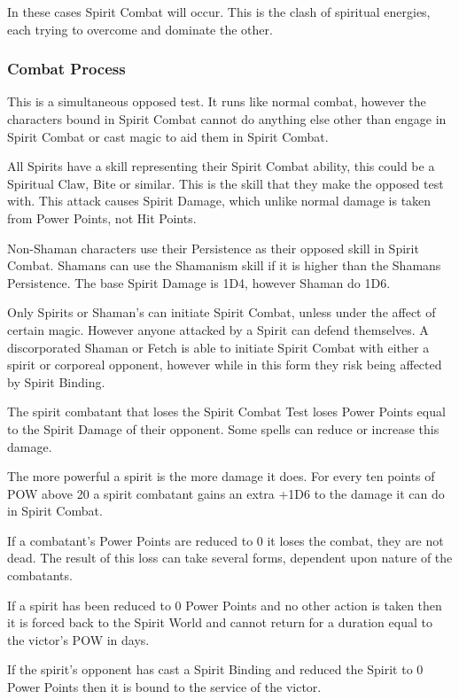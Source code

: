 In these cases Spirit Combat will occur. This is the clash of spiritual energies, each trying to overcome and dominate the other.

\subsubsection{Combat Process}
\begin{rpg-list}
\item This is a simultaneous opposed test. It runs like normal combat, however the characters bound in Spirit Combat cannot do anything else other than engage in Spirit Combat or cast magic to aid them in Spirit Combat. 
\item All Spirits have a skill representing their Spirit Combat ability, this could be a Spiritual Claw, Bite or similar. This is the skill that they make the opposed test with. This attack causes Spirit Damage, which unlike normal damage is taken from Power Points, not Hit Points.
\item Non-Shaman characters use their Persistence as their opposed skill in Spirit Combat. Shamans can use the Shamanism skill if it is higher than the Shamans Persistence. The base Spirit Damage is 1D4, however Shaman do 1D6.
\item Only Spirits or Shaman’s can initiate Spirit Combat, unless under the affect of certain magic. However anyone attacked by a Spirit can defend themselves. A discorporated Shaman or Fetch is able to initiate Spirit Combat with either a spirit or corporeal opponent, however while in this form they risk being affected by Spirit Binding.
\item The spirit combatant that loses the Spirit Combat Test loses Power Points equal to the Spirit Damage of their opponent. Some spells can reduce or increase this damage.
\item The more powerful a spirit is the more damage it does. For every ten points of POW above 20 a spirit combatant gains an extra +1D6 to the damage it can do in Spirit Combat.
\item If a combatant’s Power Points are reduced to 0 it loses the combat, they are not dead. The result of this loss can take several forms, dependent upon nature of the combatants.
\item If a spirit has been reduced to 0 Power Points and no other action is taken then it is forced back to the Spirit World and cannot return for a duration equal to the victor’s POW in days.
\item If the spirit’s opponent has cast a Spirit Binding and reduced the Spirit to 0 Power Points then it is bound to the service of the victor. 

\end{rpg-list}
